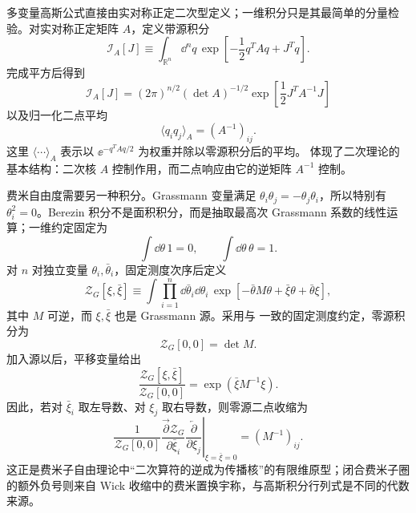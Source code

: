 
多变量高斯公式直接由实对称正定二次型定义；一维积分只是其最简单的分量检验。对实对称正定矩阵 $A$，定义带源积分
\begin{equation}
\mathcal I_A[J]\equiv
\int_{\mathbb R^n}\dd^nq\,
\exp\!\left[-\frac12q^TAq+J^Tq\right].
\label{eq:euclidean-gaussian-definition-dp68}
\end{equation}
完成平方后得到
\begin{equation}
{
\mathcal I_A[J]
=(2\pi)^{n/2}(\det A)^{-1/2}
\exp\!\left[\frac12J^TA^{-1}J\right]}
\label{eq:euclidean-gaussian-source-dp21}
\end{equation}
以及归一化二点平均
\begin{equation}
{
\langle q_iq_j\rangle_A=(A^{-1})_{ij}.}
\label{eq:gaussian-covariance-dp21}
\end{equation}
这里 $\langle\cdots\rangle_A$ 表示以 $\ee^{-q^TAq/2}$ 为权重并除以零源积分后的平均。 体现了二次理论的基本结构：二次核 $A$ 控制作用，而二点响应由它的逆矩阵 $A^{-1}$ 控制。

费米自由度需要另一种积分。Grassmann 变量满足 $\theta_i\theta_j=-\theta_j\theta_i$，所以特别有 $\theta_i^2=0$。Berezin 积分不是面积积分，而是抽取最高次 Grassmann 系数的线性运算；一维约定固定为
\begin{equation}
\int\dd\theta\,1=0,
\qquad
\int\dd\theta\,\theta=1.
\label{eq:berezin-definition-dp68}
\end{equation}
对 $n$ 对独立变量 $\theta_i,\bar\theta_i$，固定测度次序后定义
\begin{equation}
\mathcal Z_G[\xi,\bar\xi]\equiv
\int\prod_{i=1}^{n}\dd\bar\theta_i\dd\theta_i\,
\exp\!\left[-\bar\theta M\theta+\bar\xi\theta+\bar\theta\xi\right],
\label{eq:grassmann-source-definition-dp68}
\end{equation}
其中 $M$ 可逆，而 $\xi,\bar\xi$ 也是 Grassmann 源。采用与 一致的固定测度约定，零源积分为
\begin{equation}
{
\mathcal Z_G[0,0]=\det M.}
\label{eq:grassmann-gaussian-determinant-dp68}
\end{equation}
加入源以后，平移变量给出
\begin{equation}
{
\frac{\mathcal Z_G[\xi,\bar\xi]}{\mathcal Z_G[0,0]}
=\exp\!\left(\bar\xi M^{-1}\xi\right).}
\label{eq:grassmann-source-gaussian-dp68}
\end{equation}
因此，若对 $\bar\xi_i$ 取左导数、对 $\xi_j$ 取右导数，则零源二点收缩为
\begin{equation}
{
\left.
\frac{1}{\mathcal Z_G[0,0]}
\frac{\overrightarrow\partial\mathcal Z_G}{\partial\bar\xi_i}
\frac{\overleftarrow\partial}{\partial\xi_j}
\right|_{\xi=\bar\xi=0}
=(M^{-1})_{ij}.}
\label{eq:grassmann-inverse-kernel-dp68}
\end{equation}
这正是费米子自由理论中“二次算符的逆成为传播核”的有限维原型；闭合费米子圈的额外负号则来自 Wick 收缩中的费米置换宇称，与高斯积分行列式是不同的代数来源。

